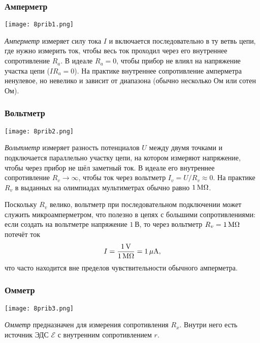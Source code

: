 \documentclass[12pt, a4paper]{article}%
\begin{document}
\subsubsection*{Амперметр}

\begin{center}
\texttt{[image: 8prib1.png]}
\label{fig:mpr}
\end{center}

\textit{Амперметр} измеряет силу тока $I$ и включается последовательно в ту ветвь цепи, где нужно измерить ток, чтобы весь ток проходил через его внутреннее сопротивление $R_a$. В идеале $R_a=0$, чтобы прибор не влиял на напряжение участка цепи ($IR_a = 0$). На практике внутреннее сопротивление амперметра ненулевое, но невелико и зависит от диапазона (обычно несколько Ом или сотен Ом).


\subsubsection*{Вольтметр}

\begin{center}
\texttt{[image: 8prib2.png]}
\label{fig:mpr}
\end{center}

\textit{Вольтметр} измеряет разность потенциалов $U$ между двумя точками и подключается параллельно участку цепи, на котором измеряют
напряжение, чтобы через прибор не шёл заметный ток. В идеале его внутреннее сопротивление $R_v\to\infty$, чтобы ток через
вольтметр $I_v=U/R_v\approx0$. На практике $R_v$ в выданных на олимпиадах мультиметрах обычно равно $1\rm\,M\Omega$.

Поскольку $R_v$ велико, вольтметр при последовательном подключении может служить микроамперметром, что полезно в цепях с большими сопротивлениями: если создать на вольтметре напряжение $1$ В, то через вольтметр $R_v=1\rm\,M\Omega$ потечёт ток  
\[
I = \frac{1\rm\,V}{1\rm\,M\Omega} = 1\rm\,\mu A,
\]
что часто находится вне пределов чувствительности обычного амперметра.


\subsubsection*{Омметр}

\begin{center}
\texttt{[image: 8prib3.png]}
\label{fig:mpr}
\end{center}

\textit{Омметр} предназначен для измерения сопротивления $R_x$. Внутри него есть источник ЭДС $\mathscr{E}$ с внутренним сопротивлением $r$.
\end{document}
